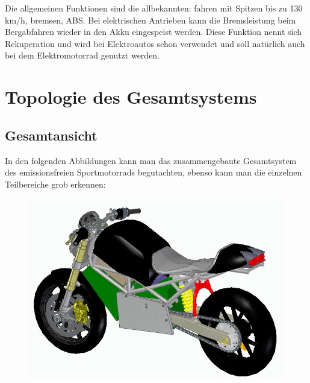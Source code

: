 Die allgemeinen Funktionen sind die allbekannten: fahren mit Spitzen bis zu 130 km/h, bremsen, ABS. Bei elektrischen Antrieben kann die Bremsleistung beim Bergabfahren wieder in den Akku eingespeist werden. Diese Funktion nennt sich Rekuperation und wird bei Elektroautos schon verwendet und soll natürlich auch bei dem Elektromotorrad genutzt werden.
\newpage

\section{Topologie des Gesamtsystems}

\subsection{Gesamtansicht}

In den folgenden Abbildungen kann man das zusammengebaute Gesamtsystem des emissionsfreien Sportmotorrads begutachten, ebenso kann man die einzelnen Teilbereiche grob erkennen:

\begin{figure} [H]
	\begin{center}
		\includegraphics[scale=0.7] {figures/mechanik/Ducati1.jpg}
	\end{center}
\end{figure}

